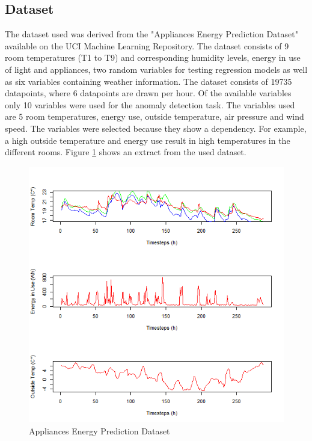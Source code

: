 \subsection{Dataset}
The dataset used was derived from the "Appliances Energy Prediction Dataset" available on the UCI Machine Learning Repository. The dataset consists of 9 room temperatures (T1 to T9) and corresponding humidity levels, energy in use of light and appliances, two random variables for testing regression models as well as six variables containing weather information. The dataset consists of 19735 datapoints, where 6 datapoints are drawn per hour. Of the available variables only 10 variables were used for the anomaly detection task. The variables used are 5 room temperatures, energy use, outside temperature, air pressure and wind speed. The variables were selected because they show a dependency. For example, a high outside temperature and energy use result in high temperatures in the different rooms. Figure \ref{fig:temp_dataset} shows an extract from the used dataset.


\begin{figure}[h]
	\centering
	\includegraphics[scale=0.6]{Figures/temp_dataset}
	\decoRule
	\caption[Temperature Dataset]{Appliances Energy Prediction Dataset \parencite{Own or UCI???}}
	\label{fig:temp_dataset}
\end{figure}

